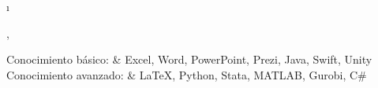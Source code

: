 \documentclass[a4paper,10pt]{article}
\newcommand{\tablength}{}
\newcommand{\setCols}[1]{			%
	\ifnum0=\i						%
		\ifdim0cm=#1				%
			\def \firstCol {r}		%
		\else						%
			\def \firstCol {p{#1}}		%
		\fi						%
	\else \ifnum1=\i				%
		\ifdim0cm=#1				%
			\def \secondCol {l}		%
		\else						%
			\def \secondCol{p{#1}}	%
		\fi						%
	\else \ifnum2=\i				%
		\ifnum0=#1				%
			\def \sep {}			%
		\else						%
			\def \sep {|}			%
		\fi						%
	\fi \fi \fi						%
	\advance\i by1					%
}
\newcommand{\tab}[1]{					%
	\newcount\i						%
	\forlistloop{\setCols}{\tablength}		%
	\begin{tabular}{\firstCol \sep \secondCol}	%
		#1							%
	\end{tabular} \\						%
}
\begin{document}
\tab{
Conocimiento básico:
	& Excel, Word, PowerPoint, Prezi, Java, Swift, Unity 	\\

Conocimiento avanzado:
	& {\fb \LaTeX}, Python, Stata, MATLAB, Gurobi, C\#	\\
}


%		
%		
%		
%		
%		
\end{document}
